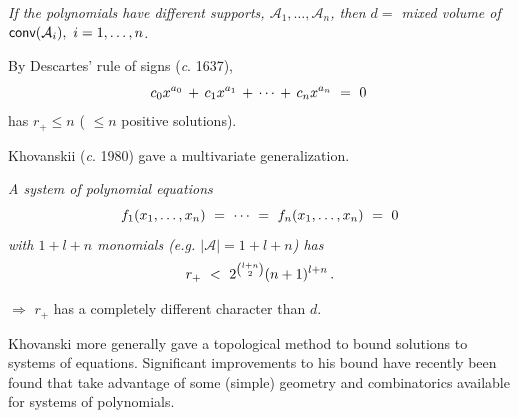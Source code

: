 \documentclass[17pt,landscape]{Narrow}
\newcommand{\conv}{\mbox{\sf conv}}
\newcommand{\calA}{{\mathcal A}}
\begin{document}
\begin{flushleft}
\noindent{}
{\sl 
If the polynomials have different supports,  $\calA_1,\dotsc,\calA_n$,
then $d=$ mixed volume of $\conv(\calA_i),\ i=1,\dotsc,n$.
}


\slide{}
\LogoOn
\begin{center}
\end{center}

By Descartes' rule of signs ({\sl c}. 1637),\vspace{-8pt}
\[
  c_0x^{a_0} \,+\,c_1x^{a_1}\,+\,\dotsb\,+\,c_nx^{a_n}\ =\ 0\,\vspace{-8pt}
\]
has $r_+\leq n$ ( $\leq n$ positive solutions).

Khovanskii ({\sl c}. 1980) gave a multivariate generalization.\vspace{-5pt}

\noindent{}
{\sl
 A system of polynomial equations\vspace{-8pt}
\[
   f_1(x_1,\dotsc,x_n)\ =\ \dotsb\ =\ f_n(x_1,\dotsc,x_n)\ =\ 0\vspace{-8pt}
\]
 with $1+l+n$ monomials (e.g. $|\calA|=1+l+n$) has\vspace{-8pt}
\[
   r_+\ <\ 
   2^{\binom{l+n}{2}}(n+1)^{l+n}\,.\vspace{-25pt}
\]
}

\noindent
$\Rightarrow$ $r_+$ has a completely different character than $d$.



\slide{}
\LogoOn
\begin{center}
\end{center}

Khovanski more generally gave a topological method to bound solutions to
systems of equations.
Significant improvements to his bound have recently been found that take advantage of some (simple)
geometry and combinatorics available for systems of polynomials.\vspace{-5pt}


\end{flushleft}
\end{document}
